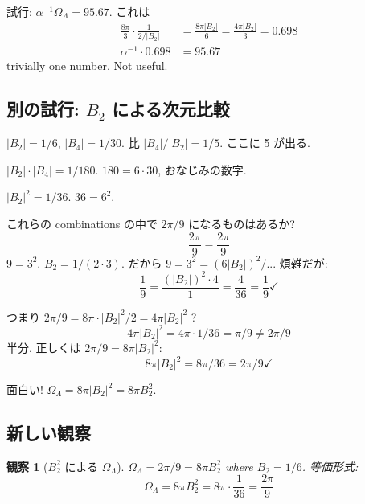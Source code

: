 \documentclass[11pt,a4paper]{article}
\newtheorem{observation}{観察}
\begin{document}
試行: $\alpha^{-1} \Omega_\Lambda = 95.67$. これは
\begin{align}
\frac{8\pi}{3} \cdot \frac{1}{2/|B_2|} &= \frac{8\pi |B_2|}{6} = \frac{4\pi |B_2|}{3} = 0.698\\
\alpha^{-1} \cdot 0.698 &= 95.67
\end{align}
trivially one number. Not useful.

\subsection{別の試行: $B_2$ による次元比較}

$|B_2| = 1/6$, $|B_4| = 1/30$. 比 $|B_4|/|B_2| = 1/5$. ここに 5 が出る.

$|B_2| \cdot |B_4| = 1/180$. $180 = 6 \cdot 30$, おなじみの数字.

$|B_2|^2 = 1/36$. $36 = 6^2$.

これらの combinations の中で $2\pi/9$ になるものはあるか?
\begin{equation}
\frac{2\pi}{9} = \frac{2\pi}{9}
\end{equation}
$9 = 3^2$. $B_2 = 1/(2 \cdot 3)$. だから $9 = 3^2 = (6|B_2|)^2/... $
煩雑だが:
\begin{equation}
\frac{1}{9} = \frac{(|B_2|)^2 \cdot 4}{1} = \frac{4}{36} = \frac{1}{9} \checkmark
\end{equation}

つまり $2\pi/9 = 8\pi \cdot |B_2|^2/2 = 4\pi |B_2|^2$ ?
\begin{equation}
4\pi |B_2|^2 = 4\pi \cdot 1/36 = \pi/9 \neq 2\pi/9
\end{equation}
半分. 正しくは $2\pi/9 = 8\pi |B_2|^2$:
\begin{equation}
8\pi |B_2|^2 = 8\pi/36 = 2\pi/9 \checkmark
\end{equation}

面白い! $\Omega_\Lambda = 8\pi |B_2|^2 = 8\pi B_2^2$.

\subsection{新しい観察}

\begin{observation}[$B_2^2$ による $\Omega_\Lambda$]
$\Omega_\Lambda = 2\pi/9 = 8\pi B_2^2$ where $B_2 = 1/6$.
等価形式:
\begin{equation}
\Omega_\Lambda = 8\pi B_2^2 = 8\pi \cdot \frac{1}{36} = \frac{2\pi}{9}
\end{equation}
\end{observation}
\end{document}
